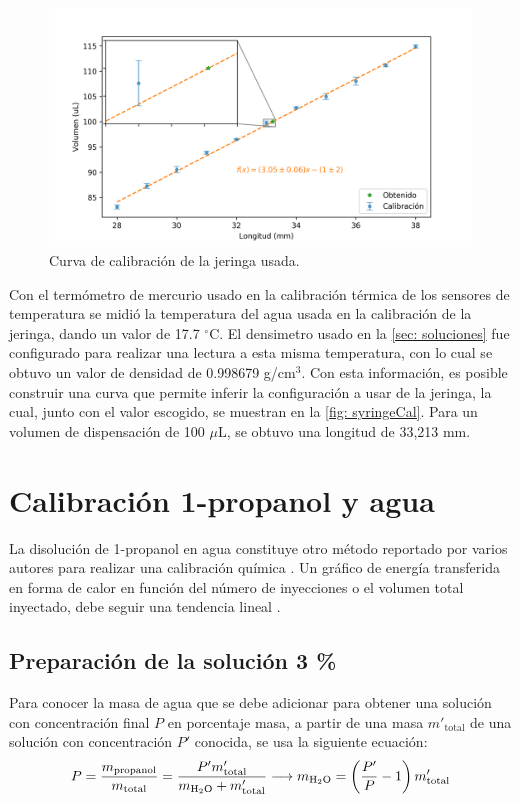 	\begin{figure}[h!]
		\centering
		\includegraphics[width=\linewidth]{../Data/Syringe/syringe_cal.png}
		\caption{Curva de calibraci\'on de la jeringa usada.}
		\label{fig: syringeCal}
	\end{figure}
	
	Con el termómetro de mercurio usado en la calibración térmica de los sensores de temperatura se midió la temperatura del agua usada en la calibración de la jeringa, dando un valor de 17.7 $^\circ$C. El densimetro usado en la \autoref{sec: soluciones} fue configurado para realizar una lectura a esta misma temperatura, con lo cual se obtuvo un valor de densidad de 0.998679 g/cm$^3$. Con esta información, es posible construir una curva que permite inferir la configuración a usar de la jeringa, la cual, junto con el valor escogido, se muestran en la \autoref{fig: syringeCal}. Para un volumen de dispensación de 100 $\mu$L, se obtuvo una longitud de 33,213 mm.	

\section{Calibraci\'on 1-propanol y agua}
	La disoluci\'on de 1-propanol en agua constituye otro m\'etodo reportado por varios autores para realizar una calibraci\'on qu\'imica \cite{briggner1991test, nanoitc, demarse2011calibration, adao2012chemical}. Un gr\'afico de energ\'ia transferida en forma de calor en funci\'on del n\'umero de inyecciones o el volumen total inyectado, debe seguir una tendencia lineal \cite{demarse2011calibration, nanoitc, adao2012chemical}. 
	
\subsection{Preparaci\'on de la soluci\'on 3 \%}
	Para conocer la masa de agua que se debe adicionar para obtener una soluci\'on con concentraci\'on final $P$ en porcentaje masa, a partir de una masa $m'_\text{total}$ de una soluci\'on con concentraci\'on $P'$ conocida, se usa la siguiente ecuaci\'on:
	\begin{equation}\label{eq: massConcentration}
		P = \dfrac{m_\text{propanol}}{m_\text{total}} = \dfrac{P'm'_\text{total}}{m_\text{\ce{H2O}} + m'_\text{total}} \longrightarrow m_\text{\ce{H2O}} = \left(\dfrac{P'}{P} -1\right)m'_\text{total}
	\end{equation}
	
